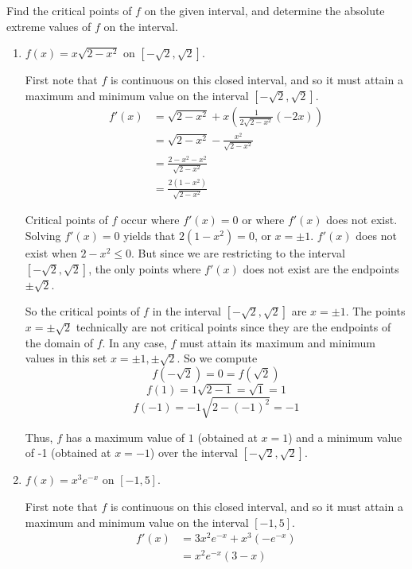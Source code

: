 \documentclass[nooutcomes]{ximera}
\begin{document}
\begin{problem}
Find the critical points of $f$ on the given interval, and determine the absolute extreme values of $f$ on the interval.
		\begin{enumerate}
		
			\item  $f(x) = x \sqrt{2-x^2}$ on $[ -\sqrt{2}, \sqrt{2} ]$.
				
				\begin{freeResponse}
				First note that $f$ is continuous on this closed interval, and so it must attain a maximum and minimum value on the interval $[-\sqrt{2}, \sqrt{2}]$.
				\begin{align*}
				f'(x) &= \sqrt{2-x^2} + x \left( \frac{1}{2 \sqrt{2-x^2}} (-2x) \right) \\
				&= \sqrt{2-x^2} - \frac{x^2}{\sqrt{2-x^2}} \\
				&= \frac{2-x^2-x^2}{\sqrt{2-x^2}} \\
				&= \frac{2(1-x^2)}{\sqrt{2-x^2}}
				\end{align*}
				
				Critical points of $f$ occur where $f'(x) = 0$ or where $f'(x)$ does not exist.  Solving $f'(x) = 0$ yields that $2(1-x^2) = 0$, or $x = \pm 1$.  $f'(x)$ does not exist when $2-x^2 \leq 0$.  But since we are restricting to the interval $[-\sqrt{2}, \sqrt{2}]$, the only points where $f'(x)$ does not exist are the endpoints $\pm \sqrt{2}$.  
				
				So the critical points of $f$ in the interval $[-\sqrt{2}, \sqrt{2}]$ are $x = \pm 1$.  The points $x = \pm \sqrt{2}$ technically are not critical points since they are the endpoints of the domain of $f$.  In any case, $f$ must attain its maximum and minimum values in this set $x = \pm 1, \pm \sqrt{2}$.  So we compute
				$$ f(-\sqrt{2}) = 0 = f(\sqrt{2}) $$
				$$ f(1) = 1 \sqrt{2-1} = \sqrt{1} = 1$$
				$$ f(-1) = -1 \sqrt{2-(-1)^2} = -1 $$
				
				Thus, $f$ has a maximum value of $1$ (obtained at $x= 1$) and a minimum value of -1 (obtained at $x= -1 $) over the interval $[-\sqrt{2}, \sqrt{2}]$.
				\end{freeResponse}
				
				
				
			\item  $f(x) = x^3 e^{-x}$ on $[-1,5]$.
			
				\begin{freeResponse}
				First note that $f$ is continuous on this closed interval, and so it must attain a maximum and minimum value on the interval $[-1,5]$.
				\begin{align*}
				f'(x) &= 3x^2 e^{-x} + x^3(-e^{-x}) \\
				&= x^2 e^{-x} (3-x)
				\end{align*}
				

\end{freeResponse}
\end{enumerate}
\end{problem}
\end{document}
